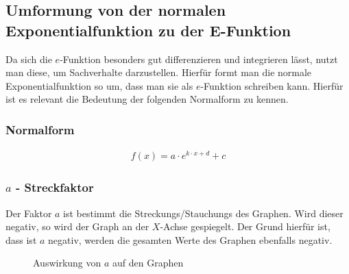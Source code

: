 \subsection{Umformung von der normalen Exponentialfunktion zu der E-Funktion}\label{sec:E-Funktion/Umformung von der normalen Exponentialfunktion zu der E-Funktion}
Da sich die $e$-Funktion besonders gut differenzieren und integrieren lässt, nutzt man diese, um Sachverhalte darzustellen. Hierfür formt man die normale Exponentialfunktion so um, dass man sie als $e$-Funktion schreiben kann. Hierfür ist es relevant die Bedeutung der folgenden Normalform zu kennen. 
\subsubsection{Normalform}\label{sec:E-Funktion/Umformung von der normalen Exponentialfunktion zu der E-Funktion/Normalform}
\begin{align*}
	f(x)=a\cdot e^{k\cdot x+d}+c
\end{align*}
\pagebreak
\subsubsection{$a$ - Streckfaktor}\label{sec:E-Funktion/Umformung von der normalen Exponentialfunktion zu der E-Funktion/Normalform/a - Streckfaktor}
Der Faktor $a$ ist bestimmt die Streckungs/Stauchungs des Graphen. Wird dieser negativ, so wird der Graph an der $X$-Achse gespiegelt. Der Grund hierfür ist, dass ist $a$ negativ, werden die gesamten Werte des Graphen ebenfalls negativ. 
\begin{figure}[h]
\centering
	\caption{Auswirkung von $a$ auf den Graphen}
\end{figure}
\pagebreak
